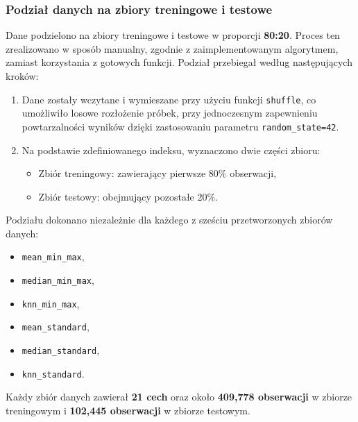 \documentclass[10pt,letterpaper]{article}
\begin{document}
\subsubsection{Podział danych na zbiory treningowe i testowe}
Dane podzielono na zbiory treningowe i testowe w proporcji \textbf{80:20}. Proces ten zrealizowano w sposób manualny, zgodnie z zaimplementowanym algorytmem, zamiast korzystania z gotowych funkcji. Podział przebiegał według następujących kroków:
\begin{enumerate}
	\item Dane zostały wczytane i wymieszane przy użyciu funkcji \texttt{shuffle}, co umożliwiło losowe rozłożenie próbek, przy jednoczesnym zapewnieniu powtarzalności wyników dzięki zastosowaniu parametru \texttt{random\_state=42}.
	\item Na podstawie zdefiniowanego indeksu, wyznaczono dwie części zbioru:
	\begin{itemize}
		\item Zbiór treningowy: zawierający pierwsze 80\% obserwacji,
		\item Zbiór testowy: obejmujący pozostałe 20\%.
	\end{itemize}
\end{enumerate}
Podziału dokonano niezależnie dla każdego z sześciu przetworzonych zbiorów danych:

\begin{itemize}
	\item \texttt{mean\_min\_max},
	\item \texttt{median\_min\_max},
	\item \texttt{knn\_min\_max},
	\item \texttt{mean\_standard},
	\item \texttt{median\_standard},
	\item \texttt{knn\_standard}.
\end{itemize}
Każdy zbiór danych zawierał \textbf{21 cech} oraz około \textbf{409,778 obserwacji} w zbiorze treningowym i \textbf{102,445 obserwacji} w zbiorze testowym.
\end{document}
